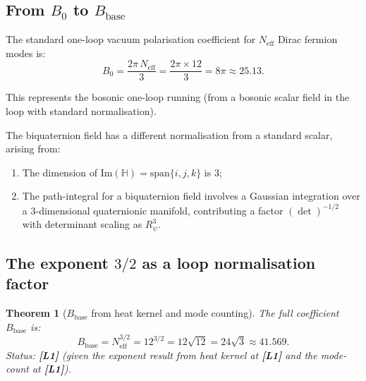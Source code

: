 \documentclass[11pt,a4paper]{article}
\newtheorem{theorem}{Theorem}
\newcommand{\Lone}{\textbf{[L1]}}
\begin{document}
\subsection{From $B_0$ to $B_{\mathrm{base}}$}

The standard one-loop vacuum polarisation coefficient for $N_{\mathrm{eff}}$
Dirac fermion modes is:
\begin{equation}
\label{eq:b0}
  B_0
  = \frac{2\pi\,N_{\mathrm{eff}}}{3}
  = \frac{2\pi\times 12}{3}
  = 8\pi
  \approx 25.13.
\end{equation}

This represents the bosonic one-loop running (from a bosonic scalar field
in the loop with standard normalisation).

The biquaternion field has a different normalisation from a standard scalar,
arising from:
\begin{enumerate}
  \item The dimension of $\mathrm{Im}(\mathbb{H}) = \mathrm{span}\{i,j,k\}$ is 3;
  \item The path-integral for a biquaternion field involves a Gaussian integration
    over a $3$-dimensional quaternionic manifold, contributing a factor
    $(\det)^{-1/2}$ with determinant scaling as $R_\psi^3$.
\end{enumerate}

\subsection{The exponent $3/2$ as a loop normalisation factor}

\begin{theorem}[$B_{\mathrm{base}}$ from heat kernel and mode counting]\label{thm:bbase}
  The full coefficient $B_{\mathrm{base}}$ is:
  \begin{equation}
  \label{eq:bbase}
    B_{\mathrm{base}}
    = N_{\mathrm{eff}}^{3/2}
    = 12^{3/2}
    = 12\sqrt{12}
    = 24\sqrt{3}
    \approx 41.569.
  \end{equation}
  Status: \Lone{} (given the exponent result from heat kernel at \Lone{}
  and the mode-count at \Lone{}).
\end{theorem}
\end{document}
